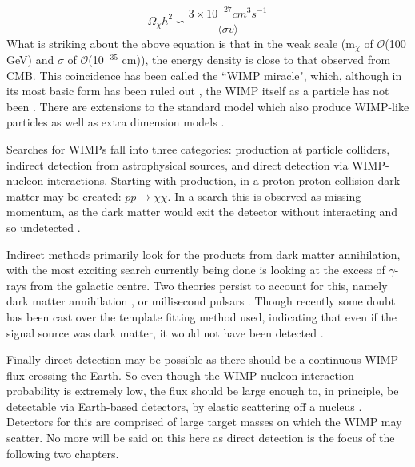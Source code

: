 \begin{equation}
    \Omega_\chi h^2 \backsim \frac{3\times 10^{-27} cm^3s^{-1}}{ \langle \sigma v \rangle}
\end{equation}
What is striking about the above equation is that in the weak scale (m$_\chi$ of $\mathcal{O}$(100 GeV) and $\sigma$ of $\mathcal{O}$(10$^{-35}$ cm)), the energy density is close to that observed from CMB.
This coincidence has been called the ``WIMP miracle", which, although in its most basic form has been ruled out \cite{less_of_a_wimp_miracle_ref}, the WIMP itself as a particle has not been \cite{wimp_theory_ref}.
There are extensions to the standard model which also produce WIMP-like particles \cite{supersymetry_wimpy_boi_ref,supersymetry_wimpy_again_ref} as well as extra dimension models \cite{extradimention_wimps_ref}.

\par
Searches for WIMPs fall into three categories: production at particle colliders, indirect detection from astrophysical sources, and direct detection via WIMP-nucleon interactions.
Starting with production, in a proton-proton collision dark matter may be created: $pp\xrightarrow{}\chi\chi$.
In a search this is observed as missing momentum, as the dark matter would exit the detector without interacting and so undetected \cite{lhc_darkmatter_ref}.
\par
Indirect methods primarily look for the products from dark matter annihilation, with the most exciting search currently being done is looking at the excess of $\gamma$-rays from the galactic centre.
Two theories persist to account for this, namely dark matter annihilation \cite{galactic_gamma_excess_1_ref, galactic_gamma_excess_2_ref}, or millisecond pulsars \cite{galactic_gamma_excess_3_ref, galactic_gamma_excess_4_ref}.
Though recently some doubt has been cast over the template fitting method used, indicating that even if the signal source was dark matter, it would not have been detected \cite{galactic_gamma_excess_5_ref}.
\par
Finally direct detection may be possible as there should be a continuous WIMP flux crossing the Earth.
So even though the WIMP-nucleon interaction probability is extremely low, the flux should be large enough to, in principle, be detectable via Earth-based detectors, by elastic scattering off a nucleus \cite{wimp_nucleon_interactions_first_suggestion_ref,supersymmetric_dark_matter_ref}.
Detectors for this are comprised of large target masses on which the WIMP may scatter.
No more will be said on this here as direct detection is the focus of the following two chapters.

